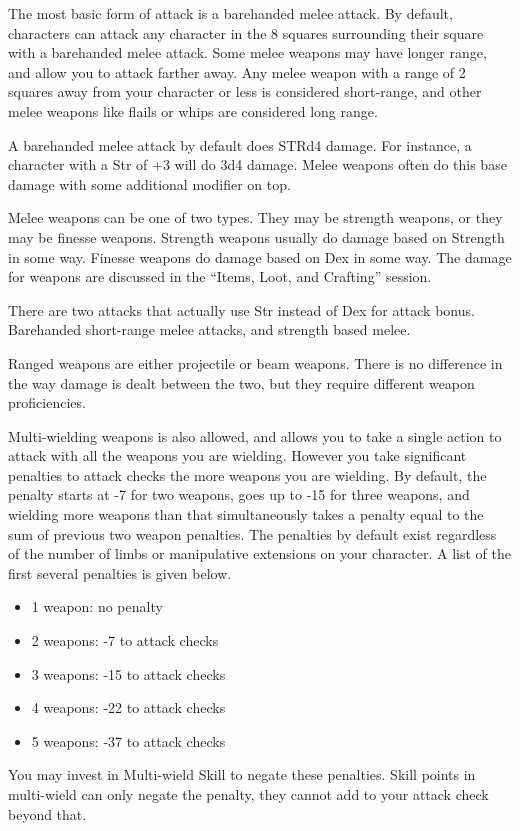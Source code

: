 The most basic form of attack is a barehanded melee attack. By default, characters can attack any character in the 8 squares surrounding their square with a barehanded melee attack. Some melee weapons may have longer range, and allow you to attack farther away. Any melee weapon with a range of 2 squares away from your character or less is considered short-range, and other melee weapons like flails or whips are considered long range.

A barehanded melee attack by default does STRd4 damage. For instance, a character with a Str of +3 will do 3d4 damage. Melee weapons often do this base damage with some additional modifier on top.

Melee weapons can be one of two types. They may be strength weapons, or they may be finesse weapons. Strength weapons usually do damage based on Strength in some way. Finesse weapons do damage based on Dex in some way. The damage for weapons are discussed in the “Items, Loot, and Crafting” session.

There are two attacks that actually use Str instead of Dex for attack bonus. Barehanded short-range melee attacks, and strength based melee.

Ranged weapons are either projectile or beam weapons. There is no difference in the way damage is dealt between the two, but they require different weapon proficiencies.

Multi-wielding weapons is also allowed, and allows you to take a single action to attack with all the weapons you are wielding. However you take significant penalties to attack checks the more weapons you are wielding. By default, the penalty starts at -7 for two weapons, goes up to -15 for three weapons, and wielding more weapons than that simultaneously takes a penalty equal to the sum of previous two weapon penalties. The penalties by default exist regardless of the number of limbs or manipulative extensions on your character. A list of the first several penalties is given below.
\begin{itemize}
\item 1 weapon: no penalty
\item 2 weapons: -7 to attack checks 
\item 3 weapons: -15 to attack checks 
\item 4 weapons: -22 to attack checks 
\item 5 weapons: -37 to attack checks
\end{itemize}
You may invest in Multi-wield Skill to negate these penalties. Skill points in multi-wield can only negate the penalty, they cannot add to your attack check beyond that.

